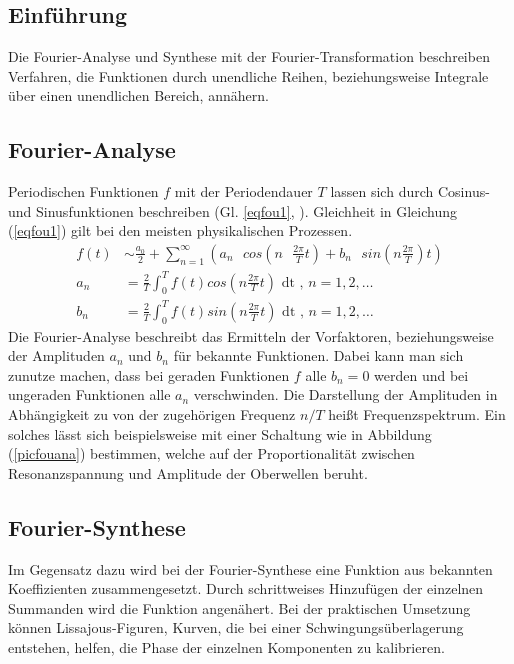 \subsection{Einführung}
Die Fourier-Analyse und Synthese mit der Fourier-Transformation beschreiben Verfahren, die 
Funktionen durch unendliche Reihen, beziehungsweise Integrale über einen unendlichen Bereich,
annähern.\\
\subsection{Fourier-Analyse} 

Periodischen Funktionen $f$ mit der Periodendauer $T$ lassen sich durch Cosinus- und Sinusfunktionen
beschreiben (Gl. \ref{eqfou1}, \cite{anleitung}). Gleichheit in Gleichung (\ref{eqfou1}) gilt bei den meisten physikalischen Prozessen.
\begin{align}
f(t) &\sim \frac{a_0}{2} + \sum_{n=1}^{\infty} (a_n \text{ } cos(n \text{ } \frac{2 \pi}{T} t) + b_n \text{ } sin(n \frac{2 \pi}{T}) t) \label{eqfou1} \\
a_n &= \frac{2}{T} \int_0^T f(t) cos(n \frac{2 \pi}{T} t) \text{ dt} \text{ , } n=1,2, \ldots \label{eqfoua}\\
b_n &= \frac{2}{T} \int_0^T f(t) sin(n \frac{2 \pi}{T} t) \text{ dt} \text{ , } n=1,2, \ldots \label{eqfoub}
\end{align}
Die Fourier-Analyse beschreibt das Ermitteln der Vorfaktoren, beziehungsweise der Amplituden $a_n$ und $b_n$ für bekannte Funktionen.
Dabei kann man sich zunutze machen, dass bei geraden Funktionen $f$ alle $b_n=0$ werden und bei
ungeraden Funktionen alle $a_n$ verschwinden. Die Darstellung der Amplituden in Abhängigkeit zu von der zugehörigen Frequenz $n/T$
heißt Frequenzspektrum. Ein solches lässt sich beispielsweise mit einer Schaltung wie in Abbildung (\ref{picfouana})
bestimmen, welche auf der Proportionalität zwischen Resonanzspannung und Amplitude der Oberwellen beruht.
\subsection{Fourier-Synthese}
Im Gegensatz dazu wird bei der Fourier-Synthese eine Funktion aus bekannten Koeffizienten zusammengesetzt.
Durch schrittweises Hinzufügen der einzelnen Summanden wird die Funktion angenähert. Bei der
praktischen Umsetzung können Lissajous-Figuren, Kurven, die bei einer Schwingungsüberlagerung entstehen, helfen, 
die Phase der einzelnen Komponenten zu kalibrieren.
